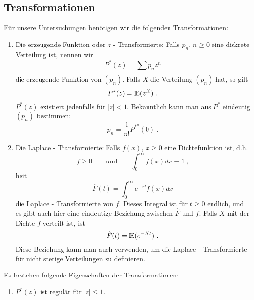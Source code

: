 \begin{appendix}
\chapter{Transformationen}
Für unsere Untersuchungen benötigen wir die folgenden Transformationen:
\begin{enumerate}
\item Die erzeugende Funktion oder $z$ - Transformierte: Falls $p_{n}$, $n
\geq 0$ eine diskrete Verteilung ist, nennen wir
\begin{displaymath}
P^{*}(z) = \sum_{}^{} p_{n} z^{n}
\end{displaymath}
die erzeugende Funktion von $(p_{n})$. Falls $X$ die Verteilung $(p_{n})$
hat, so gilt
\begin{displaymath}
P^{*}(z) = {\rm I\kern-0.2em E} (z^{X}) ~.
\end{displaymath}
$P^{*}(z)$ existiert jedenfalls für $|z|<1$. Bekanntlich kann man aus
$P^{*}$ eindeutig $(p_{n})$ bestimmen:
\begin{displaymath}
p_{n} = \frac{1}{n!} P^{*^{n}} (0) ~.
\end{displaymath}
\item Die Laplace - Transformierte: Falls $f(x)$, $x \geq 0$ eine
Dichtefunktion ist, d.h.
\begin{displaymath}
f \geq 0 \qquad \mbox{und} \qquad \int_{0}^{\infty} f(x)dx = 1 ~,
\end{displaymath}
hei\3t
\begin{displaymath}
\hat F(t) = \int_{0}^{\infty} e^{-xt} f(x)dx
\end{displaymath}
die Laplace - Transformierte von $f$. Dieses Integral ist für $t \geq 0$
endlich, und es gibt auch hier eine eindeutige Beziehung zwischen $\hat F$
und $f$. Falls $X$ mit der Dichte $f$ verteilt ist, ist
\begin{displaymath}
\hat F(t) = {\rm I\kern-0.2em E} (e^{-Xt}) ~.
\end{displaymath}
Diese Beziehung kann man auch verwenden, um die Laplace - Transformierte
für nicht stetige Verteilungen zu definieren.
\end{enumerate}
Es bestehen folgende Eigenschaften der Transformationen:
\begin{enumerate}
\item $P^{*}(z)$ ist regulär für $|z| \leq 1$.

\end{enumerate}
\end{appendix}
